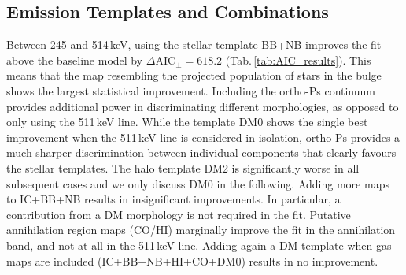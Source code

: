 \documentclass[doublespace,nopageskip]{VTthesis}
\begin{document}
\subsection{Emission Templates and Combinations}\label{sec:maps_as_they_are}
%
Between 245 and 514\,keV, using the stellar template BB+NB improves the fit above the baseline model by $\Delta\mathrm{AIC}_{\pm} = 618.2$ (Tab.\,\ref{tab:AIC_results}). 
%
This means that the map resembling the projected population of stars in the bulge shows the largest statistical improvement.
%
Including the ortho-Ps continuum provides additional power in discriminating different morphologies, as opposed to only using the 511\,keV line.
%
While the template DM0 shows the single best improvement when the 511\,keV line is considered in isolation, ortho-Ps provides a much sharper discrimination between individual components that clearly favours the stellar templates.
%
The halo template DM2 is significantly worse in all subsequent cases and we only discuss DM0 in the following.
%
Adding more maps to IC+BB+NB results in insignificant improvements.
%
In particular, a contribution from a DM morphology is not required in the fit.
%
Putative annihilation region maps (CO/HI) marginally improve the fit in the annihilation band, and not at all in the 511\,keV line.
%
Adding again a DM template when gas maps are included (IC+BB+NB+HI+CO+DM0) results in no improvement.
%
\end{document}
